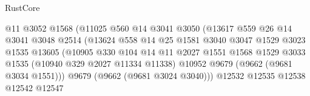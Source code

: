 \begin{lexlean}{RustCore}
\begin{coremodule}
                                          @11
                                          @3052
                                          @1568
                                          (@11025
                                            @560
                                            @14
                                            @3041
                                            @3050
                                            (@13617
                                              @559
                                              @26
                                              @14
                                              @3041
                                              @3048
                                              @2514
                                              (@13624
                                                @558
                                                @14
                                                @25
                                                @1581
                                                @3040
                                                @3047
                                                @1529
                                                @3023
                                                @1535
                                                @13605
                                                (@10905
                                                  @330
                                                  @104
                                                  @14
                                                  @11
                                                  @2027
                                                  @1551
                                                  @1568
                                                  @1529
                                                  @3033
                                                  @1535
                                                  (@10940 @329 @2027 @11334 @11338)
                                                  @10952
                                                  @9679
                                                  (@9662 (@9681 @3034 @1551)))
                                                @9679
                                                (@9662 (@9681 @3024 @3040)))
                                              @12532
                                              @12535
                                              @12538
                                              @12542
                                              @12547

\end{coremodule}
\end{lexlean}

